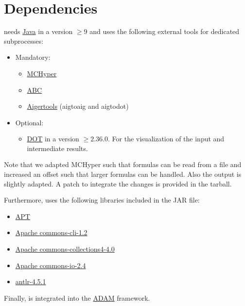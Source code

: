 \documentclass[12pt,twoside,a4paper,openright]{memoir}
\begin{document}
\section{Dependencies}
\tool{} needs \href{}{Java} in a version \(\geq 9\) and uses the following external tools for dedicated subprocesses:
\begin{itemize}
\item Mandatory:
\begin{itemize}
  \item \href{https://www.react.uni-saarland.de/tools/mchyper/}{MCHyper}
  \item \href{https://people.eecs.berkeley.edu/~alanmi/abc/}{ABC}
  \item \href{http://fmv.jku.at/aiger/}{Aigertools} (aigtoaig and aigtodot)
\end{itemize}
	\item Optional:
\begin{itemize}
  \item \href{http://www.graphviz.org/}{DOT} in a version \(\geq 2.36.0\). For the visualization of the input and intermediate results.
\end{itemize}
\end{itemize}
Note that we adapted MCHyper such that formulas can be read from a file and increased an offset such that
larger formulas can be handled. Also the output is slightly adapted.
A patch to integrate the changes is provided in the tarball.

Furthermore, \tool{} uses the following libraries included in the JAR file:
\begin{itemize}
	\item \href{https://github.com/CvO-Theory/apt/}{APT}
	\item \href{https://commons.apache.org/proper/commons-cli/}{Apache commons-cli-1.2}
	\item \href{https://commons.apache.org/proper/commons-collections/}{Apache commons-collections4-4.0}
	\item \href{https://commons.apache.org/proper/commons-io/}{Apache commons-io-2.4}
	\item \href{https://www.antlr.org/}{antlr-4.5.1}
\end{itemize}
Finally, \tool{} is integrated into the \href{https://uol.de/csd/adam/}{ADAM} framework.
\end{document}
